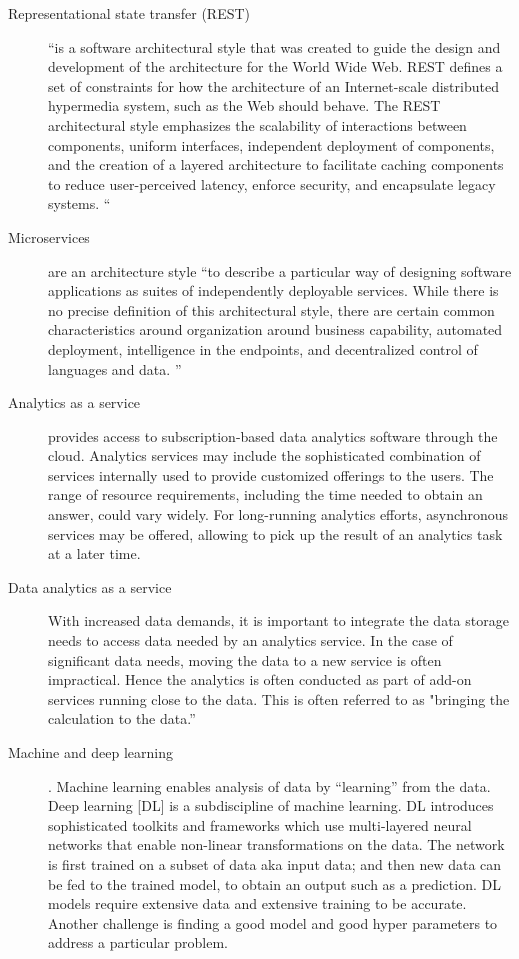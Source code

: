 \begin{description}
\item[Representational state transfer (REST)]
     ``is a software architectural style that was created to guide the
     design and development of the architecture for the World Wide
     Web. REST defines a set of constraints for how the architecture
     of an Internet-scale distributed hypermedia system, such as the
     Web should behave. The REST architectural style emphasizes the
     scalability of interactions between components, uniform
     interfaces, independent deployment of components, and the
     creation of a layered architecture to facilitate caching
     components to reduce user-perceived latency, enforce security,
     and encapsulate legacy systems.\cite{www-rest} ``

\item[Microservices]
     are an architecture style ``to describe a particular way of
     designing software applications as suites of independently
     deployable services. While there is no precise definition of this
     architectural style, there are certain common characteristics
     around organization around business capability, automated
     deployment, intelligence in the endpoints, and decentralized
     control of languages and data. \cite{www-microservices}''

\item[Analytics as a service]
     provides access to subscription-based data analytics software
     through the cloud. Analytics services may include the
     sophisticated combination of services internally used to provide
     customized offerings to the users. The range of resource
     requirements, including the time needed to obtain an answer, could
     vary widely. For long-running analytics efforts, asynchronous
     services may be offered, allowing to pick up the result of an
     analytics task at a later time.

\item[Data analytics as a service]
     With increased data demands, it is important to integrate the data
     storage needs to access data needed by an analytics service. In
     the case of significant data needs, moving the data
     to a new service is often impractical. Hence the analytics is often conducted as part
     of add-on services running close to the data. This is often referred to as "bringing the calculation to the data.''

\item[Machine and deep learning].
     Machine learning enables analysis of data by  ``learning''
     from the data. Deep learning [DL] is a subdiscipline of machine
     learning. DL introduces sophisticated toolkits and frameworks which use multi-layered neural networks that enable non-linear
     transformations on the data. The network is first trained on
     a subset of data aka input data; and then new data can be fed to the trained model, to
     obtain an output such as a prediction. DL models require extensive data and
     extensive training to be accurate. Another challenge is finding a good model and good hyper parameters to address a particular
     problem.


\end{description}

